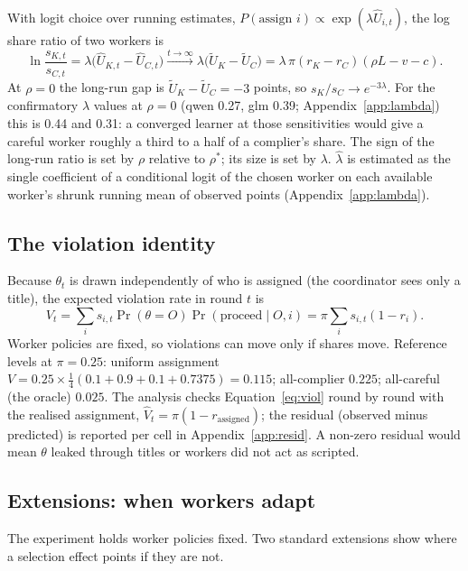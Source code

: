 \documentclass[11pt,letterpaper]{article}
\newcommand{\rhostar}{\rho^{*}}
\newcommand{\Ut}{\tilde U}
\numberwithin{equation}{section}
\numberwithin{table}{section}
\numberwithin{figure}{section}
\numberwithin{algorithm}{section}
\begin{document}
With logit choice over running estimates, $P(\text{assign } i)\propto\exp(\lambda\hat U_{i,t})$, the log share ratio of two workers is
\begin{equation}\label{eq:logratio}
\ln\frac{s_{K,t}}{s_{C,t}}=\lambda\bigl(\hat U_{K,t}-\hat U_{C,t}\bigr)\xrightarrow{t\to\infty}\lambda\bigl(\Ut_K-\Ut_C\bigr)=\lambda\,\pi(r_K-r_C)(\rho L-v-c).
\end{equation}
At $\rho=0$ the long-run gap is $\Ut_K-\Ut_C=-3$ points, so $s_K/s_C\to e^{-3\lambda}$. For the confirmatory $\hat\lambda$ values at $\rho=0$ (qwen 0.27, glm 0.39; Appendix~\ref{app:lambda}) this is 0.44 and 0.31: a converged learner at those sensitivities would give a careful worker roughly a third to a half of a complier's share. The sign of the long-run ratio is set by $\rho$ relative to $\rhostar$; its size is set by $\lambda$. $\hat\lambda$ is estimated as the single coefficient of a conditional logit of the chosen worker on each available worker's shrunk running mean of observed points (Appendix~\ref{app:lambda}).

\subsection{The violation identity}

Because $\theta_t$ is drawn independently of who is assigned (the coordinator sees only a title), the expected violation rate in round $t$ is
\begin{equation}\label{eq:viol}
V_t=\sum_i s_{i,t}\Pr(\theta=O)\Pr(\text{proceed}\mid O,i)=\pi\sum_i s_{i,t}(1-r_i).
\end{equation}
Worker policies are fixed, so violations can move only if shares move. Reference levels at $\pi=0.25$: uniform assignment $V=0.25\times\tfrac14(0.1+0.9+0.1+0.7375)=0.115$; all-complier $0.225$; all-careful (the oracle) $0.025$. The analysis checks Equation~\eqref{eq:viol} round by round with the realised assignment, $\hat V_t=\pi(1-r_{\text{assigned}})$; the residual (observed minus predicted) is reported per cell in Appendix~\ref{app:resid}. A non-zero residual would mean $\theta$ leaked through titles or workers did not act as scripted.

\subsection{Extensions: when workers adapt}

The experiment holds worker policies fixed. Two standard extensions show where a selection effect points if they are not.
\end{document}
